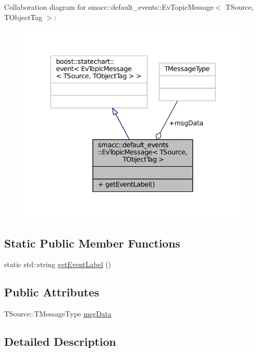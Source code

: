 Collaboration diagram for smacc\+:\+:default\+\_\+events\+:\+:Ev\+Topic\+Message$<$ T\+Source, T\+Object\+Tag $>$\+:
\nopagebreak
\begin{figure}[H]
\begin{center}
\leavevmode
\includegraphics[width=332pt]{structsmacc_1_1default__events_1_1EvTopicMessage__coll__graph}
\end{center}
\end{figure}
\subsection*{Static Public Member Functions}
\begin{DoxyCompactItemize}
\item 
static std\+::string \hyperlink{structsmacc_1_1default__events_1_1EvTopicMessage_afaa5fc76f1c6c3eaf30deb8aa58508c0}{get\+Event\+Label} ()
\end{DoxyCompactItemize}
\subsection*{Public Attributes}
\begin{DoxyCompactItemize}
\item 
T\+Source\+::\+T\+Message\+Type \hyperlink{structsmacc_1_1default__events_1_1EvTopicMessage_a82384568b702a0c3a3dc2fbe7eeefea9}{msg\+Data}
\end{DoxyCompactItemize}


\subsection{Detailed Description}
